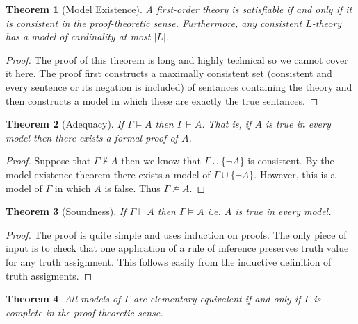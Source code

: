 \documentclass[12pt]{article}
\newcommand{\proves}{\vdash}
\newcommand{\entails}{\models}
\theoremstyle{theorem}
\newtheorem{theorem}{Theorem}[section]
\theoremstyle{definition}
\theoremstyle{definition}
\theoremstyle{remark}
\theoremstyle{definition}
\theoremstyle{remark}
\begin{document}
\begin{theorem}[Model Existence]
A first-order theory is satisfiable if and only if it is consistent in the proof-theoretic sense. Furthermore, any consistent $L$-theory has a model of cardinality at most $|L|$. 
\end{theorem}

\begin{proof}
The proof of this theorem is long and highly technical so we cannot cover it here. The proof first constructs a maximally consistent set (consistent and every sentence or its negation is included) of sentances containing the theory and then constructs a model in which these are exactly the true sentances.   
\end{proof}

\begin{theorem}[Adequacy]
If $\Gamma \entails A$ then $\Gamma \proves A$. That is, if $A$ is true in every model then there exists a formal proof of $A$.
\end{theorem}

\begin{proof}
Suppose that $\Gamma \not\proves A$ then we know that $\Gamma \cup \{\neg A\}$ is consistent. By the model existence theorem there exists a model of $\Gamma \cup \{ \neg A \}$. However, this is a model of $\Gamma$ in which $A$ is false. Thus $\Gamma \not\entails A$.  
\end{proof}

\begin{theorem}[Soundness]
If $\Gamma \proves A$ then $\Gamma \entails A$ i.e. $A$ is true in every model.
\end{theorem}

\begin{proof}
The proof is quite simple and uses induction on proofs. The only piece of input is to check that one application of a rule of inference preserves truth value for any truth assignment. This follows easily from the inductive definition of truth assigments. 
\end{proof}

\begin{theorem}
All models of $\Gamma$ are elementary equivalent if and only if $\Gamma$ is complete in the proof-theoretic sense. 
\end{theorem}
\end{document}
